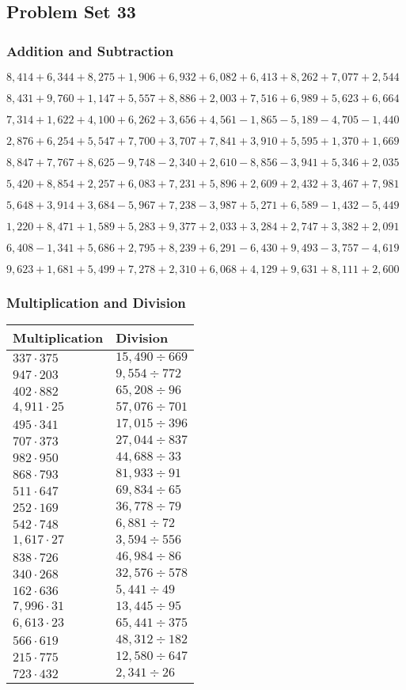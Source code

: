 \hypertarget{problem-set-33-3}{%
\subsection{Problem Set 33}\label{problem-set-33-3}}

\hypertarget{addition-and-subtraction-195}{%
\subsubsection{Addition and
Subtraction}\label{addition-and-subtraction-195}}

\(8,414+6,344+8,275+1,906+6,932+6,082+6,413+8,262+7,077+ 2,544\)

\(8,431+9,760+1,147+5,557+8,886+2,003+7,516+6,989+5,623+6,664\)

\(7,314+1,622+4,100+6,262+3,656+4,561-1,865-5,189-4,705-1,440\)

\(2,876+6,254+5,547+7,700+3,707+7,841+3,910+5,595+1,370+1,669\)

\(8,847+7,767+8,625-9,748-2,340+2,610-8,856-3,941+5,346+2,035\)

\(5,420+8,854+2,257+6,083+7,231+5,896+2,609+2,432+3,467+7,981\)

\(5,648+3,914+3,684-5,967+7,238-3,987+5,271+6,589-1,432-5,449\)

\(1,220+8,471+1,589+5,283+9,377+2,033+3,284+2,747+3,382+2,091\)

\(6,408-1,341+5,686+2,795+8,239+6,291-6,430+9,493-3,757-4,619\)

\(9,623+1,681+5,499+7,278+2,310+6,068+4,129+9,631+8,111+2,600\)

\hypertarget{multiplication-and-division-194}{%
\subsubsection{Multiplication and
Division}\label{multiplication-and-division-194}}

\begin{longtable}[]{@{}ll@{}}
\toprule
Multiplication & Division\tabularnewline
\midrule
\endhead
\(337\cdot375\) & \(15,490÷669\)\tabularnewline
\(947\cdot203\) & \(9,554÷772\)\tabularnewline
\(402\cdot882\) & \(65,208÷96\)\tabularnewline
\(4,911\cdot25\) & \(57,076÷701\)\tabularnewline
\(495\cdot341\) & \(17,015÷396\)\tabularnewline
\(707\cdot373\) & \(27,044÷837\)\tabularnewline
\(982\cdot950\) & \(44,688÷33\)\tabularnewline
\(868\cdot793\) & \(81,933÷91\)\tabularnewline
\(511\cdot647\) & \(69,834÷65\)\tabularnewline
\(252\cdot169\) & \(36,778÷79\)\tabularnewline
\(542\cdot748\) & \(6,881÷72\)\tabularnewline
\(1,617\cdot27\) & \(3,594÷556\)\tabularnewline
\(838\cdot726\) & \(46,984÷86\)\tabularnewline
\(340\cdot268\) & \(32,576÷578\)\tabularnewline
\(162\cdot636\) & \(5,441÷49\)\tabularnewline
\(7,996\cdot31\) & \(13,445÷95\)\tabularnewline
\(6,613\cdot23\) & \(65,441÷375\)\tabularnewline
\(566\cdot619\) & \(48,312÷182\)\tabularnewline
\(215\cdot775\) & \(12,580÷647\)\tabularnewline
\(723\cdot432\) & \(2,341÷26\)\tabularnewline
\bottomrule
\end{longtable}

